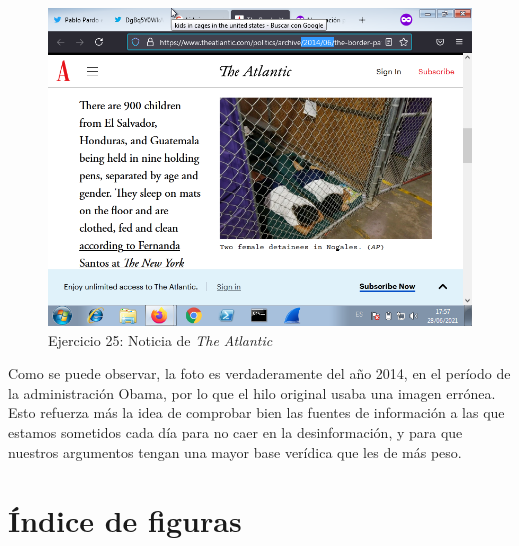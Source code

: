 \documentclass[11pt]{article}
\begin{document}
\begin{figure}[H]
    \caption{Ejercicio 25: Noticia de \textit{The Atlantic}}
  \centering
    \includegraphics[scale=0.8]{p05/e31-5.png}
\end{figure}

Como se puede observar, la foto es verdaderamente del año 2014, en el período de la administración Obama, por lo que el hilo original usaba una imagen errónea. Esto refuerza más la idea de comprobar bien las fuentes de información a las que estamos sometidos cada día para no caer en la desinformación, y para que nuestros argumentos tengan una mayor base verídica que les de más peso. 



\newpage

\section{Índice de figuras}

\listoffigures
\end{document}
